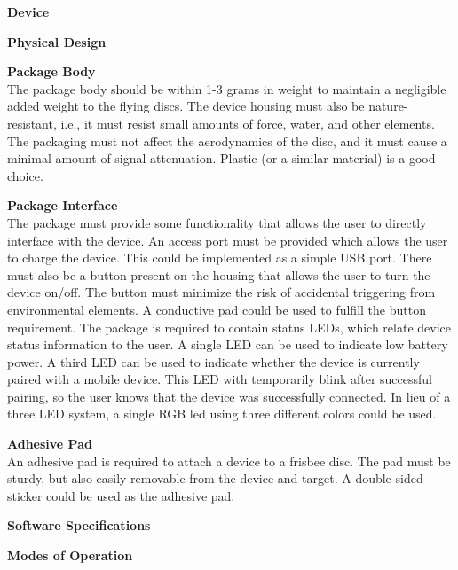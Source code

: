 \documentclass[12pt]{article}
\begin{document}
  \begin{packed_enum}
    \item \textbf{Device}
    \begin{packed_enum}
      \item \textbf{Physical Design}
      \begin{packed_enum}
        \item \textbf{Package Body} \\
        The package body should be within 1-3 grams in weight to maintain a negligible added weight to the 
        flying discs. The device housing must also be nature-resistant, i.e., it must resist small amounts of
        force, water, and other elements. The packaging must not affect the aerodynamics of the disc, and it
        must cause a minimal amount of signal attenuation. Plastic (or a similar material) is a good choice.
        \item \textbf{Package Interface} \\
        The package must provide some functionality that allows the user to directly interface with the device.
        An access port must be provided which allows the user to charge the device. This could be implemented 
        as a simple USB port. There must also be a button present on the housing that allows the user to turn
        the device on/off. The button must minimize the risk of accidental triggering from environmental
        elements. A conductive pad could be used to fulfill the button requirement. The package is required
        to contain status LEDs, which relate device status information to the user. A single LED can be used
        to indicate low battery power. A third LED can be used to indicate whether the device is currently
        paired with a mobile device. This LED with temporarily blink after successful pairing, so the user knows
        that the device was successfully connected. In lieu of a three LED system, a single RGB led using three
        different colors could be used.
        \item \textbf{Adhesive Pad} \\
        An adhesive pad is required to attach a device to a frisbee disc. The pad must be sturdy, but also
        easily removable from the device and target. A double-sided sticker could be used as the adhesive pad.
      \end{packed_enum}
      \item \textbf{Software Specifications}
      \begin{packed_enum}
        \item \textbf{Modes of Operation} \\

\end{packed_enum}
\end{packed_enum}
\end{packed_enum}
\end{document}
